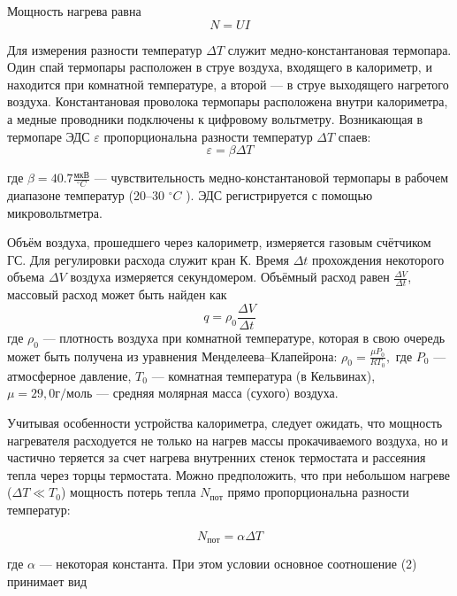 \documentclass[a4paper,12pt]{article}
\begin{document}
	
Мощность нагрева равна
\begin{equation}
    N= UI
\end{equation}

Для измерения разности температур $\Delta T$ служит медно-константановая термопара. Один спай термопары расположен в струе воздуха, входящего в
калориметр, и находится при комнатной температуре, а второй — в струе выходящего нагретого воздуха. Константановая проволока термопары расположена внутри калориметра, а медные проводники подключены к цифровому вольтметру. Возникающая в термопаре ЭДС $\varepsilon$ пропорциональна разности температур $\Delta T$ спаев: 
\begin{equation}
    \varepsilon =\beta \Delta T
\end{equation}

где $\beta = 40.7 \frac{мкВ}{^\circ C}$ — чувствительность медно-константановой термопары в рабочем диапазоне температур (20–30 $^\circ C$ ). ЭДС регистрируется с помощью микровольтметра.
		
Объём воздуха, прошедшего через калориметр, измеряется газовым счётчиком ГС. Для регулировки расхода служит кран К. Время $\Delta t$ прохождения
некоторого объема $\Delta V$ воздуха измеряется секундомером. Объёмный расход равен $\frac{\Delta V}{\Delta t} $, массовый расход может быть найден как 
\begin{equation}
    q = \rho_{0} \frac{\Delta V}{\Delta t}
\end{equation}
где $\rho_{0}$ — плотность воздуха при комнатной температуре, которая в свою очередь может быть получена из уравнения Менделеева–Клапейрона: $\rho_{0}= \frac{\mu P_{0} }{R T_{0}},$ где $P_{0}$ — атмосферное давление, $T_{0}$ — комнатная температура (в Кельвинах), $\mu = 29,0 {г/моль}$ — средняя молярная масса (сухого) воздуха.
		
Учитывая особенности устройства калориметра, следует ожидать, что мощность нагревателя расходуется не только на нагрев массы прокачиваемого воздуха, но и частично теряется за счет нагрева внутренних стенок термостата и рассеяния тепла через торцы термостата. Можно предположить, что при небольшом нагреве ($\Delta T \ll T_{0}$) мощность потерь тепла $N_{пот}$ прямо пропорциональна разности температур:

\begin{equation}
    N_{пот} = \alpha \Delta T
\end{equation}

где $\alpha$ — некоторая константа. При этом условии основное соотношение (2) принимает вид 
\end{document}
